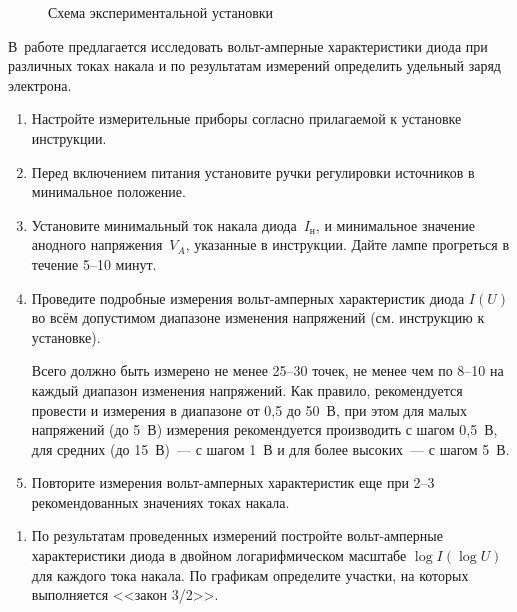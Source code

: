 \begin{figure}[h!]
    \centering
    \caption{Схема экспериментальной установки}
\end{figure}

\begin{lab:task}

В~работе предлагается исследовать вольт-амперные характеристики диода при
различных токах накала и по результатам
измерений определить удельный заряд электрона.

\begin{enumerate}

\item Настройте измерительные приборы согласно прилагаемой к установке
инструкции.

\item Перед включением питания установите ручки регулировки источников
в минимальное положение.

\item Установите минимальный ток накала диода~$I_\text{н}$, 
и минимальное значение анодного напряжения~$V_{A}$, 
указанные в инструкции. Дайте лампе прогреться в течение 5--10 минут.

\item Проведите подробные измерения вольт-амперных характеристик диода 
$I(U)$ во всём допустимом диапазоне изменения напряжений  (см. инструкцию
к установке). 

Всего должно быть измерено не менее 25--30 точек, 
не менее чем по 8--10 на каждый диапазон изменения напряжений. 
Как правило, рекомендуется провести и измерения в диапазоне от 0,5 до 50~В, 
при этом для малых напряжений (до 5~В) измерения рекомендуется производить 
с шагом 0,5~В, для средних (до 15~В)~--- с шагом 1~В и 
для более высоких~--- с шагом 5~В.

\item Повторите измерения вольт-амперных характеристик 
еще при 2--3 рекомендованных значениях токах накала.

\end{enumerate}


\begin{enumerate}
\item По результатам проведенных измерений постройте 
вольт-амперные характеристики диода 
в двойном логарифмическом масштабе
$\log I (\log U)$
для каждого тока накала. По графикам определите участки, на которых
выполняется <<закон 3/2>>.


\end{enumerate}
\end{lab:task}
